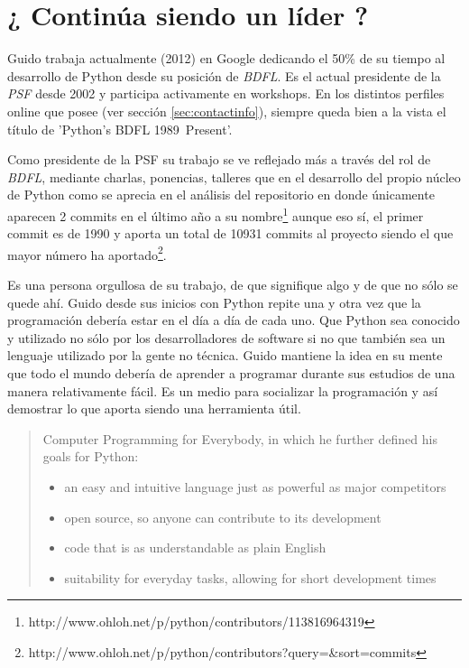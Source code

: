 \documentclass[11pt]{scrartcl}
\begin{document}
\section{¿ Continúa siendo un líder ?}\label{sec:contilider}

Guido trabaja actualmente (2012) en Google dedicando el 50\% de su tiempo al desarrollo de Python desde su posición de \emph{BDFL}. Es el actual presidente de la \emph{PSF} desde 2002 y participa activamente en workshops. En los distintos perfiles online que posee (ver sección \ref{sec:contactinfo}), siempre queda bien a la vista el título de 'Python's BDFL 1989~Present'.

Como presidente de la PSF su trabajo se ve reflejado más a través del rol de \emph{BDFL}, mediante charlas, ponencias, talleres que en el desarrollo del propio núcleo de Python como se aprecia en el análisis del repositorio en donde únicamente aparecen 2 commits en el último año a su nombre\footnote{http://www.ohloh.net/p/python/contributors/113816964319} aunque eso sí, el primer commit es de 1990 y aporta un total de 10931 commits al proyecto siendo el que mayor número ha aportado\footnote{http://www.ohloh.net/p/python/contributors?query=\&sort=commits}.

Es una persona orgullosa de su trabajo, de que signifique algo y de que no sólo se quede ahí. Guido desde sus inicios con Python repite una y otra vez que la programación debería estar en el día a día de cada uno. Que Python sea conocido y utilizado no sólo por los desarrolladores de software si no que también sea un lenguaje utilizado por la gente no técnica. Guido mantiene la idea en su mente que todo el mundo debería de aprender a programar durante sus estudios de una manera relativamente fácil. Es un medio para socializar la programación y así demostrar lo que aporta siendo una herramienta útil.

\begin{quotation}
Computer Programming for Everybody, in which he further defined his goals for Python:
    \begin{itemize}
        \item an easy and intuitive language just as powerful as major competitors
        \item open source, so anyone can contribute to its development
        \item code that is as understandable as plain English
        \item suitability for everyday tasks, allowing for short development times
    \end{itemize}
\end{quotation}
\end{document}
